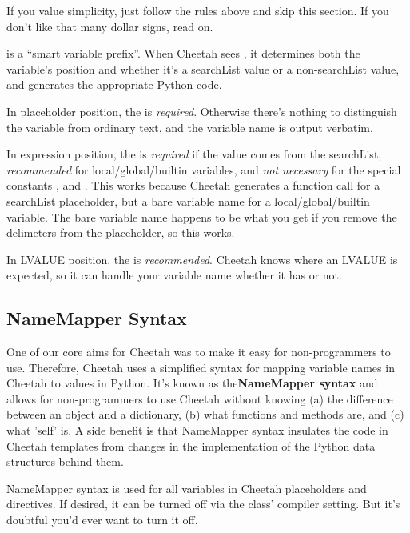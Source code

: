 If you value simplicity, just follow the \code{\$} rules above and skip this
section.  If you don't like that many dollar signs, read on.

\code{\$} is a ``smart variable prefix''.  When Cheetah sees \code{\$}, it
determines both the variable's position and whether it's a searchList value or
a non-searchList value, and generates the appropriate Python code.  

In placeholder position, the \code{\$} is {\em required}.  Otherwise there's
nothing to distinguish the variable from ordinary text, and the variable name
is output verbatim.

In expression position, the \code{\$} is {\em required} if the value comes from
the searchList, {\em recommended} for local/global/builtin variables, and 
{\em not necessary} for the special constants ,  and
.  This works because Cheetah generates a function call for a
searchList placeholder, but a bare variable name for a local/global/builtin
variable.  The bare variable name happens to be what you get if you remove the
delimeters from the placeholder, so this works.

In LVALUE position, the \code{\$} is {\em recommended}.  Cheetah knows where
an LVALUE is expected, so it can handle your variable name whether it has
\code{\$} or not.


\subsection{NameMapper Syntax}
\label{language.namemapper}

One of our core aims for Cheetah was to make it easy for non-programmers to
use. Therefore, Cheetah uses a simplified syntax for mapping variable
names in Cheetah to values in Python. It's known as the{\bf NameMapper syntax}
and allows for non-programmers to use Cheetah without knowing (a)
the difference between an object and a dictionary, (b) what functions
and methods are, and (c) what 'self' is. A side benefit is that NameMapper
syntax insulates the code in Cheetah templates from changes in the implementation
of the Python data structures behind them.

NameMapper syntax is used for all variables in Cheetah placeholders and
directives. If desired, it can be turned off via the  class'
 compiler setting.  But it's doubtful you'd ever want to
turn it off.

